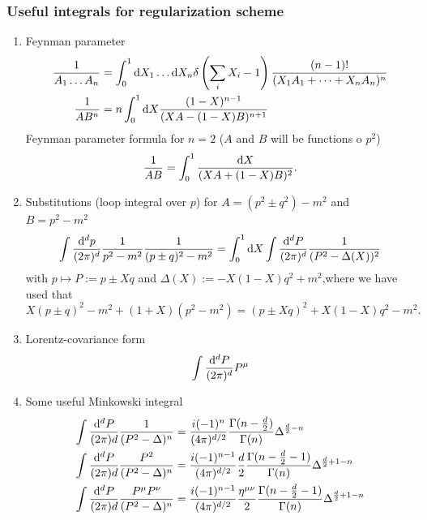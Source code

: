 \subsubsection{Useful integrals for regularization scheme}
\begin{enumerate}
	\item Feynman parameter
	\begin{align}
	\frac{1}{A_1 \dots A_n} &= \int_0^1 \mathrm{d} X_1 \dots \mathrm{d} X_n \delta \left(\sum_i X_i -1\right) \frac{(n-1)!}{(X_1 A_1+\dots+X_nA_n)^n}\\
	\frac{1}{AB^n} &=n \int_0^1 \mathrm{d} X \frac{(1-X)^{n-1}}{(XA-(1-X)B)^{n+1}}
	\end{align}
	Feynman parameter formula for $n=2$ ($A$ and $B$ will be functions o $p^2$)
	\begin{equation}
	\frac{1}{AB} = \int_0^1 \frac{\mathrm{d} X}{(XA+(1-X) B)^2}.
	\end{equation}
	\item Substitutions (loop integral over $p$) for $A=(p^2 \pm q^2)-m^2$ and $B=p^2-m^2$
	\begin{equation}
	\int \frac{\mathrm{d}^d p}{(2 \pi)^d} \frac{1}{p^2-m^2} \frac{1}{(p\pm q)^2-m^2} = \int_0^1 \mathrm{d} X \int \frac{\mathrm{d}^d P}{(2 \pi)^d} \frac{1}{(P^2-\Delta(X))^2}
	\end{equation}
	with $p\mapsto P:= p\pm Xq$ and $\Delta(X) := -X(1-X)q^2+m^2$,where we have used that 
	\begin{equation}
	X(p \pm q)^2 -m^2 +(1+X) (p^2-m^2) = (p\pm Xq)^2+X(1-X) q^2-m^2.
	\end{equation}
	\item Lorentz-covariance form
	\begin{equation}
	\int \frac{\mathrm{d}^d P}{(2 \pi)^d} P^\mu
	\end{equation}
	\item Some useful Minkowski integral
	\begin{align}
	\int \frac{\md^dP}{(2\pi) d} \frac{1}{(P^2-\Delta)^n} &= \frac{i (-1)^n}{(4\pi)^{d/2}} \frac{\Gamma(n-\frac{d}{2} )}{\Gamma(n)} \Delta^{\frac{d}{2} -n}\\
	\int \frac{\md^dP}{(2\pi) d} \frac{P^2}{(P^2-\Delta)^n} &= \frac{i (-1)^{n-1}}{(4 \pi)^{d/2}} \frac{d}{2} \frac{\Gamma(n-\frac{d}{2} -1)}{\Gamma(n)} \Delta^{\frac{d}{2} +1-n} \\
	\int \frac{\md^dP}{(2\pi) d} \frac{P^\mu P^\nu}{(P^2-\Delta)^n} &= \frac{i(-1)^{n-1}}{(4 \pi)^{d/2}} \frac{\eta^{\mu \nu}}{2} \frac{\Gamma(n-\frac{d}{2}-1)}{\Gamma(n)} \Delta^{\frac{d}{2} +1 -n}\\

\end{align}
\end{enumerate}
